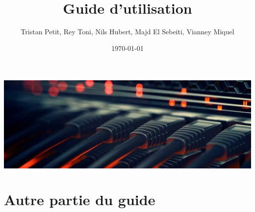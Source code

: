 \documentclass{article}
\begin{document}
\title{Guide d'utilisation}
\author{Tristan Petit, Rey Toni,
 Nils Hubert, Majd El Sebeiti, Vianney Miquel}
\date{\today}
\maketitle

\begin{center}
    \vspace{0.5cm}
    \includegraphics[width=1\textwidth]{images/reseauxMain.png}
\end{center}

\maketitle

\newpage

\section{Autre partie du guide}
\end{document}
